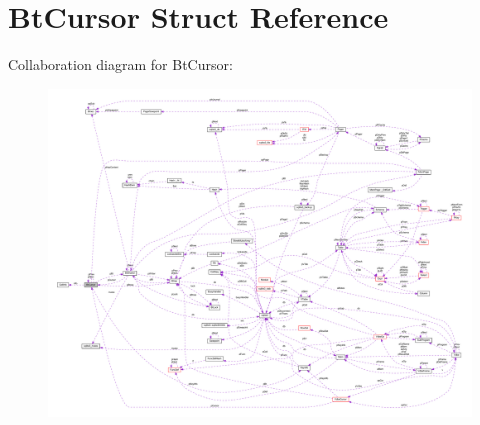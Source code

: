 \hypertarget{struct_bt_cursor}{\section{Bt\-Cursor Struct Reference}
\label{struct_bt_cursor}
}


Collaboration diagram for Bt\-Cursor\-:\nopagebreak
\begin{figure}[H]
\begin{center}
\leavevmode
\includegraphics[width=350pt]{struct_bt_cursor__coll__graph}
\end{center}
\end{figure}
